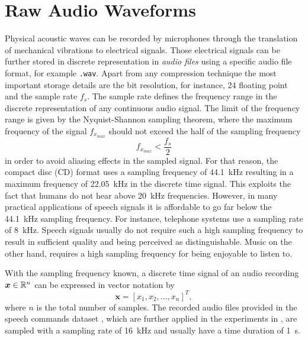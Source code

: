 
\section{Raw Audio Waveforms}\label{sec:signal_raw}
Physical acoustic waves can be recorded by microphones through the translation of mechanical vibrations to electrical signals. 
Those electrical signals can be further stored in discrete representation in \emph{audio files} using a specific audio file format, for example \texttt{.wav}.
Apart from any compression technique the most important storage details are the bit resolution, for instance, \SI{24}{\bit} floating point and the sample rate $f_s$.
The sample rate defines the frequency range in the discrete representation of any continuous audio signal.
The limit of the frequency range is given by the Nyquist-Shannon sampling theorem, where the maximum frequency of the signal $f_{x_{max}}$ should not exceed the half of the sampling frequency
\begin{equation}\label{eq:signal_raw_nyquist}
  f_{x_{max}} < \frac{f_s}{2}
\end{equation}
in order to avoid aliasing effects in the sampled signal.
For that reason, the compact disc (CD) format uses a sampling frequency of \SI{44.1}{\kilo\hertz} resulting in a maximum frequency of \SI{22.05}{\kilo\hertz} in the discrete time signal.
This exploits the fact that humans do not hear above \SI{20}{\kilo\hertz} frequencies.
However, in many practical applications of speech signals it is affordable to go far below the \SI{44.1}{\kilo\hertz} sampling frequency. 
For instance, telephone systems use a sampling rate of \SI{8}{\kilo\hertz}.
Speech signals usually do not require such a high sampling frequency to result in sufficient quality and being perceived as distinguishable.
Music on the other hand, requires a high sampling frequency for being enjoyable to listen to.

With the sampling frequency known, a discrete time signal of an audio recording $\bm{x} \in \mathbb{R}^n$ can be expressed in vector notation by
\begin{equation}\label{eq:signal_raw_x}
  \bm{x} = [x_1, x_2, \dots, x_n]^T,
\end{equation}
where $n$ is the total number of samples.
The recorded audio files provided in the speech commands dataset \cite{Warden2018}, which are further applied in the experiments in , are sampled with a sampling rate of \SI{16}{\kilo\hertz} and usually have a time duration of \SI{1}{\second}.

